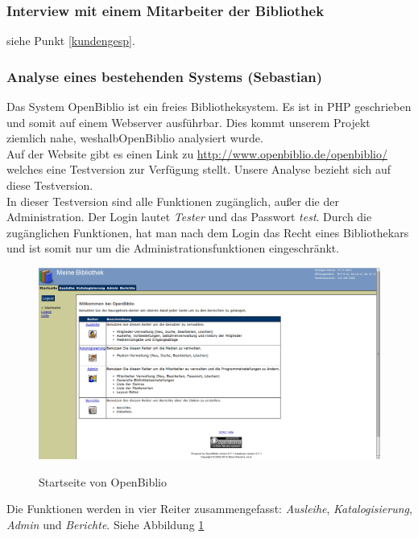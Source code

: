 \documentclass[fontsize=12pt,paper=a4,twoside]{scrartcl}
\begin{document}
\subsubsection{Interview mit einem Mitarbeiter der Bibliothek}

siehe Punkt \ref{kundengesp}.

\subsubsection{Analyse eines bestehenden Systems (Sebastian)}

Das System OpenBiblio ist ein freies Bibliotheksystem. 
Es ist in PHP geschrieben und somit
auf einem Webserver ausführbar. Dies kommt unserem 
Projekt ziemlich nahe, weshalbOpenBiblio analysiert wurde.\\
Auf der Website gibt es einen Link zu 
\url{http://www.openbiblio.de/openbiblio/} welches eine 
Testversion zur Verfügung stellt. Unsere Analyse bezieht 
sich auf diese Testversion.\\
In dieser Testversion sind alle Funktionen zugänglich, 
außer die der Administration. Der Login lautet \emph{Tester} und 
das Passwort \emph{test}. Durch die zugänglichen Funktionen, hat
man nach dem Login das Recht eines Bibliothekars und ist somit 
nur um die Administrationsfunktionen eingeschränkt.\\
\begin{figure}[h]
\caption{Startseite von OpenBiblio}
\includegraphics[width=1\textwidth]{OpenBiblio/startseite_loggedin.png}
\label{startseite-openbiblio}
\end{figure}
\newpage
Die Funktionen werden in vier Reiter zusammengefasst: \emph{Ausleihe}, \emph{Katalogisierung}, 
\emph{Admin} und \emph{Berichte}. Siehe Abbildung \ref{startseite-openbiblio}\\
\end{document}
